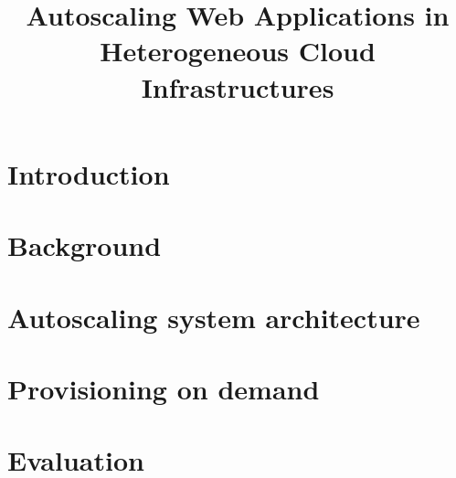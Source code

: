 \documentclass[conference]{IEEEtran}
\begin{document}
\title{Autoscaling Web Applications in Heterogeneous Cloud Infrastructures}

\author{
\and
{}
\and
{}
}

\maketitle

\begin{abstract}

\end{abstract}


\section{Introduction}

\label{sec:introduction}

\section{Background}
\label{sec:relatedWorks}


%

\section{Autoscaling system architecture}
\label{sec:proposed_approach}


\section{Provisioning on demand}
\label{sec:decisionMaking}


\section{Evaluation}
\label{sec:evaluation}

\end{document}
